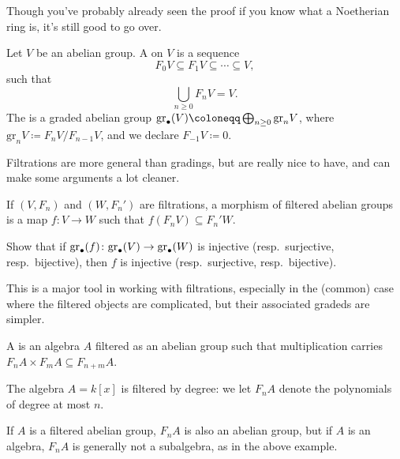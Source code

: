 Though you've probably already seen the proof if you know what a Noetherian ring is, it's still good to go over.
\begin{defn}
Let $V$ be an abelian group. A  on $V$ is a sequence
\begin{equation}
	F_0V\subseteq F_1V\subseteq\dotsb\subseteq V,
\end{equation}
such that
\begin{equation}
	\bigcup_{n\ge 0} F_nV = V.
\end{equation}
The  is a graded abelian group $\gr_\bullet(V)\coloneqq \bigoplus_{n\ge 0}\mathrm{gr}_n V$,
where $\mathrm{gr}_nV \coloneqq F_nV/F_{n-1}V$, and we declare $F_{-1}V\coloneqq 0$.
\end{defn}
Filtrations are more general than gradings, but are really nice to have, and can make some arguments a lot cleaner.
\begin{defn}
If $(V, F_n)$ and $(W, F_n')$ are filtrations, a morphism of filtered abelian groups is a map $f\colon V\to W$ such
that $f(F_nV)\subseteq F_n'W$.
\end{defn}
\begin{ex}
\label{grsurj}
Show that if $\mathrm{gr}_\bullet(f)\colon\mathrm{gr}_\bullet(V)\to\mathrm{gr}_\bullet(W)$ is injective (resp.\ surjective, resp.\
bijective), then $f$ is injective (resp.\ surjective, resp.\ bijective).
\end{ex}
This is a major tool in working with filtrations, especially in the (common) case where the filtered objects are
complicated, but their associated gradeds are simpler.
\begin{defn}
A  is an algebra $A$ filtered as an abelian group such that multiplication carries
$F_nA\times F_mA\subseteq F_{n+m}A$.
\end{defn}
\begin{exm}
The algebra $A = k[x]$ is filtered by degree: we let $F_nA$ denote the polynomials of degree at most $n$.
\end{exm}
If $A$ is a filtered abelian group, $F_nA$ is also an abelian group, but if $A$ is an algebra, $F_nA$ is generally
not a subalgebra, as in the above example.

